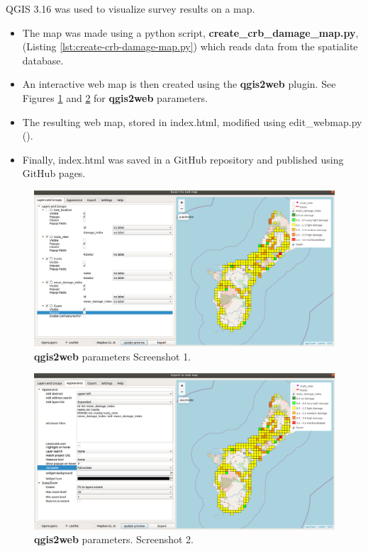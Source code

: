 \documentclass[12pt,letterpaper,english,bibliography=totocnumbered, abstract=on]{scrartcl}
\begin{document}
QGIS 3.16 was used to visualize survey results on a map. 

\begin{itemize}
	\item The map was made using a python script, 
	\textbf{create\_crb\_damage\_map.py}, 
	(Listing \ref{lst:create-crb-damage-map.py}) which reads data from 
	the spatialite database.
	\item An interactive web map is then created using the \textbf{qgis2web} plugin. 
	See Figures \ref{fig:qgis2web1} and \ref{fig:qgis2web2} for \textbf{qgis2web} parameters.
	\item The resulting	web map, stored in index.html, modified using edit\_webmap.py ().
	\item Finally, index.html was saved in
	a GitHub repository and published using GitHub pages.
\end{itemize}



%

\begin{figure}[H]
	\centering
	\includegraphics[width=\linewidth]{images/qgis2web1.png}
	\caption{\textbf{qgis2web} parameters Screenshot 1.}
	\label{fig:qgis2web1}
\end{figure}

\begin{figure}[H]
	\centering
	\includegraphics[width=\linewidth]{images/qgis2web2.png}
	\caption{\textbf{qgis2web} parameters. Screenshot 2.}
	\label{fig:qgis2web2}
\end{figure}
\end{document}
